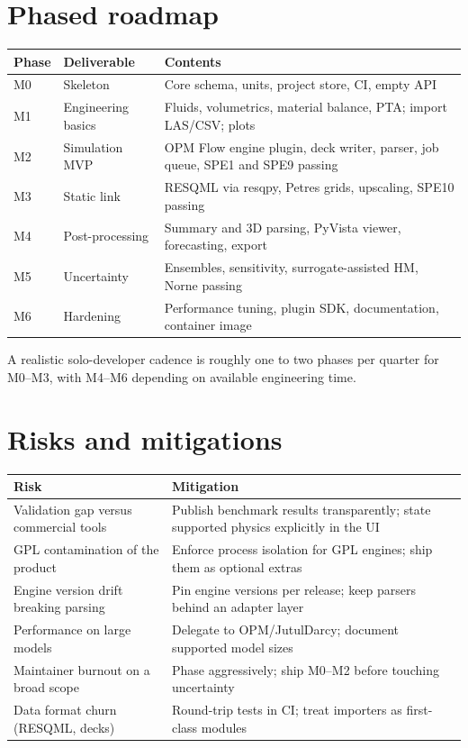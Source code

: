 \documentclass[11pt,a4paper]{article}
\begin{document}
\section{Phased roadmap}

\begin{longtable}{@{}p{1.6cm}p{4.4cm}p{8.6cm}@{}}
\toprule
\textbf{Phase} & \textbf{Deliverable} & \textbf{Contents}\\
\midrule
\endhead
M0 & Skeleton       & Core schema, units, project store, CI, empty API\\
M1 & Engineering basics & Fluids, volumetrics, material balance, PTA; import LAS/CSV; plots\\
M2 & Simulation MVP & OPM Flow engine plugin, deck writer, parser, job queue, SPE1 and SPE9 passing\\
M3 & Static link    & RESQML via resqpy, Petres grids, upscaling, SPE10 passing\\
M4 & Post-processing & Summary and 3D parsing, PyVista viewer, forecasting, export\\
M5 & Uncertainty    & Ensembles, sensitivity, surrogate-assisted HM, Norne passing\\
M6 & Hardening      & Performance tuning, plugin SDK, documentation, container image\\
\bottomrule
\end{longtable}

\noindent A realistic solo-developer cadence is roughly one to two phases per
quarter for M0--M3, with M4--M6 depending on available engineering time.

\section{Risks and mitigations}

\begin{longtable}{@{}p{4.4cm}p{9.6cm}@{}}
\toprule
\textbf{Risk} & \textbf{Mitigation}\\
\midrule
\endhead
Validation gap versus commercial tools & Publish benchmark results transparently; state supported physics explicitly in the UI\\
GPL contamination of the product & Enforce process isolation for GPL engines; ship them as optional extras\\
Engine version drift breaking parsing & Pin engine versions per release; keep parsers behind an adapter layer\\
Performance on large models & Delegate to OPM/JutulDarcy; document supported model sizes\\
Maintainer burnout on a broad scope & Phase aggressively; ship M0--M2 before touching uncertainty\\
Data format churn (RESQML, decks) & Round-trip tests in CI; treat importers as first-class modules\\
\bottomrule
\end{longtable}
\end{document}
